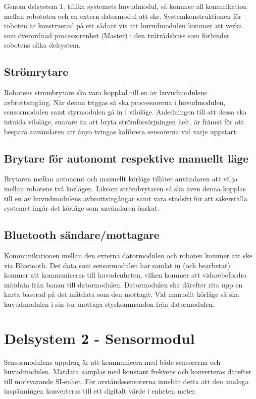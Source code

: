 \documentclass[11pt]{article}
\begin{document}
\begin{flushleft}
Genom delsystem 1, tillika systemets huvudmodul, så kommer all komunikation mellan robototen och en extern datormodul att ske. Systemkonstruktionen för roboten är konstruerad på ett sådant vis att huvudmodulen kommer att verka som överordnad processorenhet (Master) i den tvåtrådsbuss som förbinder robotens olika delsystem. 
\subsection{Strömrytare}
Robotens strömbrytare ska vara kopplad till en av huvudmodulens avbrottsingång. När denna triggas så ska processorerna i huvudmodulen, sensormodulen samt styrmodulen gå in i viloläge. Anledningen till att dessa ska inträda viloläge, snarare än att bryta strömförsörjningen helt, är främst för att bespara användaren att ånyo tvingas kalibrera sensorerna vid varje uppstart.
\subsection{Brytare för autonomt respektive manuellt läge}
Brytaren mellan autonomt och manuellt körläge tillåter användaren att välja mellan robotens två körlägen. Liksom strömbrytaren så ska även denna kopplas till en av huvudmodulens avbrottsingångar samt vara studsfri för att säkerställa systemet ingår det körläge som användaren önskat.
\subsection{Bluetooth\textsuperscript{\circledR} sändare/mottagare}
Kommunikationen mellan den externa datormodulen och roboten kommer att ske via Bluetooth\textsuperscript{\circledR}. Det data som sensormodulen har samlat in (och bearbetat) kommer att kommuniceras till huvudenheten, vilken kommer att vidarebefordra mätdata från banan till datormodulen. Datormodulen ska därefter rita upp en karta baserad på det mätdata som den mottagit. Vid manuellt körläge så ska huvudmodulen i sin tur mottaga styrkommandon från datormodulen. 
 

\pagebreak
\section{Delsystem 2 - Sensormodul}
\label{sec:sensormodul}
Sensormodulens uppdrag är att kommunicera med både sensorerna och huvudmodulen. Mätdata samplas med konstant frekvens och konverteras därefter till motsvarande SI-enhet. För avståndssensorerna innebär detta att den analoga inspänningen konverteras till ett digitalt värde i enheten meter.


\end{flushleft}
\end{document}
